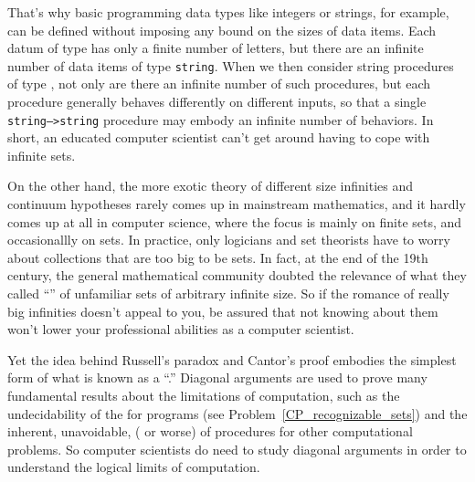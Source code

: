 That's why basic programming data types like integers or strings, for
example, can be defined without imposing any bound on the sizes of
data items.  Each datum of type  has only a
finite number of letters, but there are an infinite number of data items
of type \texttt{string}.  When we then consider string procedures of
type , not only are there
an infinite number of such procedures, but each procedure generally
behaves differently on different inputs, so that a single
\texttt{string-->string} procedure may embody an infinite number of
behaviors.  In short, an educated computer scientist can't get around having to
cope with infinite sets.

On the other hand, the more exotic theory of different size infinities
and continuum hypotheses rarely comes up in mainstream mathematics,
and it hardly comes up at all in computer science, where the focus is
mainly on finite sets, and occasionallly on  sets.  In
practice, only logicians and set theorists have to worry about
collections that are too big to be sets.  In fact, at the end of the
19th century, the general mathematical community doubted the relevance
of what they called ``'' of unfamiliar sets of
arbitrary infinite size.  So if the romance of really big infinities
doesn't appeal to you, be assured that not knowing about them won't
lower your professional abilities as a computer scientist.

Yet the idea behind Russell's paradox and Cantor's proof embodies the
simplest form of what is known as a ``.''
Diagonal arguments are used to prove many fundamental results about
the limitations of computation, such as the undecidability of
the  for programs (see
Problem~\ref{CP_recognizable_sets}) and the inherent, unavoidable,
 ( or worse) of procedures for
other computational problems.  So computer scientists do need to study
diagonal arguments in order to understand the logical limits of
computation.

